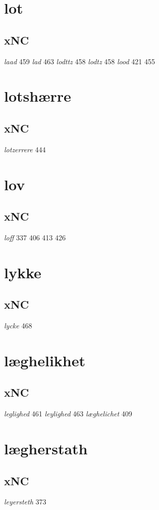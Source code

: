 \documentclass[a4paper,twocolumn]{article}
\begin{document}
\section{lot}
\label{sec:org819e220}
\subsection{xNC}
\label{sec:org98055c7}
\emph{laad} 459 \emph{lad} 463 \emph{lodttz} 458 \emph{lodtz} 458 \emph{lood} 421 455 
\section{lotshærre}
\label{sec:orgd1f0cf8}
\subsection{xNC}
\label{sec:orga980abf}
\emph{lotzerrere} 444 
\section{lov}
\label{sec:orgaf14606}
\subsection{xNC}
\label{sec:orgd24c3e6}
\emph{loff} 337 406 413 426 
\section{lykke}
\label{sec:org842b1cb}
\subsection{xNC}
\label{sec:org0f13ba2}
\emph{lycke} 468 
\section{læghelikhet}
\label{sec:org2e2d3c9}
\subsection{xNC}
\label{sec:orgadac1af}
\emph{leglighed} 461 \emph{leylighed} 463 \emph{læghelichet} 409 
\section{lægherstath}
\label{sec:org06ca473}
\subsection{xNC}
\label{sec:org055a824}
\emph{leyersteth} 373 
\end{document}
